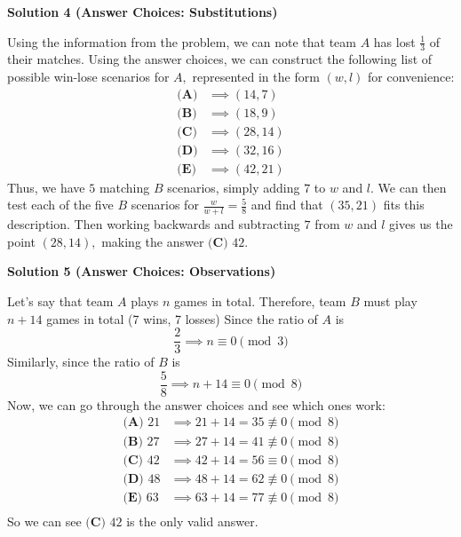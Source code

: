 \begin{enumerate}
 



\textbf{Solution 4 (Answer Choices: Substitutions)}

Using the information from the problem, we can note that team $A$ has lost $\frac{1}{3}$ of their matches. Using the answer choices, we can construct the following list of possible win-lose scenarios for $A,$ represented in the form $(w, l)$ for convenience:
 \begin{align*} \textbf{(A)} &\implies (14, 7) \\ \textbf{(B)} &\implies (18, 9) \\ \textbf{(C)} &\implies (28, 14) \\ \textbf{(D)} &\implies (32, 16) \\ \textbf{(E)} &\implies (42, 21) \end{align*}
Thus, we have $5$ matching $B$ scenarios, simply adding $7$ to $w$ and $l.$ We can then test each of the five $B$ scenarios for $\frac{w}{w+l} = \frac{5}{8}$ and find that $(35, 21)$ fits this description. Then working backwards and subtracting $7$ from $w$ and $l$ gives us the point $(28, 14),$ making the answer $\boxed{\textbf{(C) } 42}.$




\textbf{Solution 5 (Answer Choices: Observations)}

Let's say that team $A$ plays $n$ games in total. Therefore, team $B$ must play $n + 14$ games in total (7 wins, 7 losses) Since the ratio of $A$ is 
 \[\frac{2}{3} \implies n \equiv 0 \pmod{3}\] Similarly, since the ratio of $B$ is 
 \[\frac{5}{8} \implies n + 14 \equiv 0 \pmod{8}\] Now, we can go through the answer choices and see which ones work:
 \begin{align*} \textbf{(A) } 21 &\implies 21 + 14 = 35 \not \equiv 0\pmod{8} \\ \textbf{(B) } 27 &\implies 27 + 14 = 41 \not \equiv 0\pmod{8} \\ \textbf{(C) } 42 &\implies 42 + 14 = 56  \equiv 0\pmod{8} \\ \textbf{(D) } 48 &\implies 48 + 14 = 62 \not \equiv 0\pmod{8} \\ \textbf{(E) } 63 &\implies 63 + 14 = 77 \not \equiv 0\pmod{8} \\ \end{align*}
So we can see $\boxed{\textbf{(C) } 42}$ is the only valid answer.

 


 



\end{enumerate}
